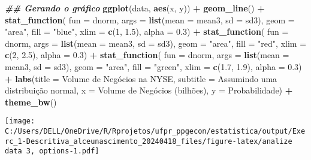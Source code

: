 \documentclass[
]{article}
\newenvironment{Shaded}{\begin{snugshade}}{\end{snugshade}}
\newcommand{\AttributeTok}[1]{\textcolor[rgb]{0.13,0.29,0.53}{#1}}
\newcommand{\DecValTok}[1]{\textcolor[rgb]{0.00,0.00,0.81}{#1}}
\newcommand{\DocumentationTok}[1]{\textcolor[rgb]{0.56,0.35,0.01}{\textbf{\textit{#1}}}}
\newcommand{\FloatTok}[1]{\textcolor[rgb]{0.00,0.00,0.81}{#1}}
\newcommand{\FunctionTok}[1]{\textcolor[rgb]{0.13,0.29,0.53}{\textbf{#1}}}
\newcommand{\NormalTok}[1]{#1}
\newcommand{\SpecialCharTok}[1]{\textcolor[rgb]{0.81,0.36,0.00}{\textbf{#1}}}
\newcommand{\StringTok}[1]{\textcolor[rgb]{0.31,0.60,0.02}{#1}}
\begin{document}
\begin{Shaded}
\begin{Highlighting}[]
\DocumentationTok{\#\# Gerando o gráfico}
\FunctionTok{ggplot}\NormalTok{(data, }\FunctionTok{aes}\NormalTok{(x, y)) }\SpecialCharTok{+}
  \FunctionTok{geom\_line}\NormalTok{() }\SpecialCharTok{+}
  \FunctionTok{stat\_function}\NormalTok{(}
    \AttributeTok{fun =}\NormalTok{ dnorm, }
    \AttributeTok{args =} \FunctionTok{list}\NormalTok{(}\AttributeTok{mean =}\NormalTok{ mean3, }\AttributeTok{sd =}\NormalTok{ sd3), }
    \AttributeTok{geom =} \StringTok{"area"}\NormalTok{, }
    \AttributeTok{fill =} \StringTok{"blue"}\NormalTok{, }
    \AttributeTok{xlim =} \FunctionTok{c}\NormalTok{(}\DecValTok{1}\NormalTok{, }\FloatTok{1.5}\NormalTok{), }
    \AttributeTok{alpha =} \FloatTok{0.3}\NormalTok{) }\SpecialCharTok{+}
  \FunctionTok{stat\_function}\NormalTok{(}
    \AttributeTok{fun =}\NormalTok{ dnorm, }
    \AttributeTok{args =} \FunctionTok{list}\NormalTok{(}\AttributeTok{mean =}\NormalTok{ mean3, }\AttributeTok{sd =}\NormalTok{ sd3), }
    \AttributeTok{geom =} \StringTok{"area"}\NormalTok{, }
    \AttributeTok{fill =} \StringTok{"red"}\NormalTok{, }
    \AttributeTok{xlim =} \FunctionTok{c}\NormalTok{(}\DecValTok{2}\NormalTok{, }\FloatTok{2.5}\NormalTok{), }
    \AttributeTok{alpha =} \FloatTok{0.3}\NormalTok{) }\SpecialCharTok{+}
  \FunctionTok{stat\_function}\NormalTok{(}
    \AttributeTok{fun =}\NormalTok{ dnorm, }
    \AttributeTok{args =} \FunctionTok{list}\NormalTok{(}\AttributeTok{mean =}\NormalTok{ mean3, }\AttributeTok{sd =}\NormalTok{ sd3), }
    \AttributeTok{geom =} \StringTok{"area"}\NormalTok{, }
    \AttributeTok{fill =} \StringTok{"green"}\NormalTok{, }
    \AttributeTok{xlim =} \FunctionTok{c}\NormalTok{(}\FloatTok{1.7}\NormalTok{, }\FloatTok{1.9}\NormalTok{), }
    \AttributeTok{alpha =} \FloatTok{0.3}\NormalTok{) }\SpecialCharTok{+}
  \FunctionTok{labs}\NormalTok{(}\AttributeTok{title =} \StringTok{\textquotesingle{}Volume de Negócios na NYSE\textquotesingle{}}\NormalTok{,}
       \AttributeTok{subtitle =} \StringTok{\textquotesingle{}Assumindo uma distribuição normal\textquotesingle{}}\NormalTok{,}
       \AttributeTok{x =} \StringTok{\textquotesingle{}Volume de Negócios (bilhões)\textquotesingle{}}\NormalTok{,}
       \AttributeTok{y =} \StringTok{\textquotesingle{}Probabilidade\textquotesingle{}}\NormalTok{) }\SpecialCharTok{+}
  \FunctionTok{theme\_bw}\NormalTok{()}
\end{Highlighting}
\end{Shaded}

\texttt{[image: C:/Users/DELL/OneDrive/R/Rprojetos/ufpr\_ppgecon/estatistica/output/Exerc\_1-Descritiva\_alceunascimento\_20240418\_files/figure-latex/analize data 3, options-1.pdf]}
\end{document}
